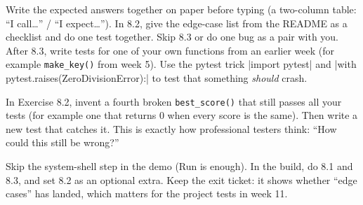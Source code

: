 \begin{differentiation}
\supportpath Write the expected answers together on paper before typing (a two-column table: \enquote{I call\ldots} / \enquote{I expect\ldots}).
In 8.2, give the edge-case list from the README as a checklist and do one test together. Skip 8.3 or do one bug as a pair with you.
\extensionpath After 8.3, write tests for one of your own functions from an earlier week (for example \texttt{make\_key()} from week 5).
Use the pytest trick \py|import pytest| and \py|with pytest.raises(ZeroDivisionError):| to test that something \emph{should} crash.
\end{differentiation}

\begin{stretchchallenge}
In Exercise 8.2, invent a fourth broken \texttt{best\_score()} that still passes all your tests (for example one that returns 0 when every score is the same).
Then write a new test that catches it. This is exactly how professional testers think: \enquote{How could this still be wrong?}
\end{stretchchallenge}

\begin{teachernote}
Skip the system-shell step in the demo (Run is enough). In the build, do 8.1 and 8.3, and set 8.2 as an optional extra.
Keep the exit ticket: it shows whether \enquote{edge cases} has landed, which matters for the project tests in week 11.
\end{teachernote}
